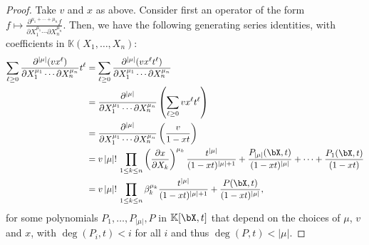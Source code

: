 \documentclass[12pt]{article}
\def\K {\ensuremath{\mathbb{K}}}
\def\K{\mathbb{K}}
\begin{document}
\begin{proof}
	Take $v$ and $x$ as above. Consider first
	an operator of the form $f \mapsto \frac{ \partial^{\mu_1+\cdots+\mu_n}  f}
	{\partial X_1^{\mu_1} \cdots \partial X_n^{\mu_n}}$. Then, we have
	the following generating series identities, with coefficients in 
	$\K(X_1,\dots,X_n)$:
	\begin{align*}
	\sum_{\ell \ge 0} 
	\frac{ \partial^{|\mu|} ( v x^\ell )} {\partial X_1^{\mu_1} \cdots
		\partial X_n^{\mu_n}}
	t^\ell 
	&=  \sum_{\ell \ge 0} 
	\frac{ \partial^{|\mu|} (v x^\ell t^\ell)} {\partial X_1^{\mu_1} \cdots
		\partial X_n^{\mu_n}}\\
	&=  
	\frac{ \partial^{|\mu|} } {\partial X_1^{\mu_1} \cdots
		\partial X_n^{\mu_n}}
	\left (\sum_{\ell \ge 0} v x^\ell t^\ell\right ) \\
	&= \frac{ \partial^{|\mu|} } {\partial X_1^{\mu_1} \cdots
		\partial X_n^{\mu_n}}
	\left (\frac v{1-xt} \right ) \\
	&= v\, |\mu|!\, \prod_{1 \le k \le n} 
	\left (\frac{ \partial x} {\partial X_k} \right)^{\mu_k}
	\frac {t^{|\mu|}}{(1-x t)^{|\mu|+1}} + \frac{P_{|\mu|}(\bX,t)}{(1-x t)^{|\mu|}} + \cdots + \frac{P_{1}(\bX,t)}{(1-x t)}\\
	&= v\, |\mu|!\, \prod_{1 \le k \le n} 
	\beta_k^{\mu_k}
	\frac {t^{|\mu|}}{(1-x t)^{|\mu|+1}} + \frac{P(\bX,t)}{(1-x t)^{|\mu|}},
	\end{align*}
	for some polynomials $P_1,\dots,P_{|\mu|},P$ in $\K[\bX,t]$ that
	depend on the choices of $\mu$, $v$ and $x$, with $\deg(P_i,t) < i$
	for all $i$ and thus $\deg(P,t) < |\mu|$.
	

\end{proof}
\end{document}
